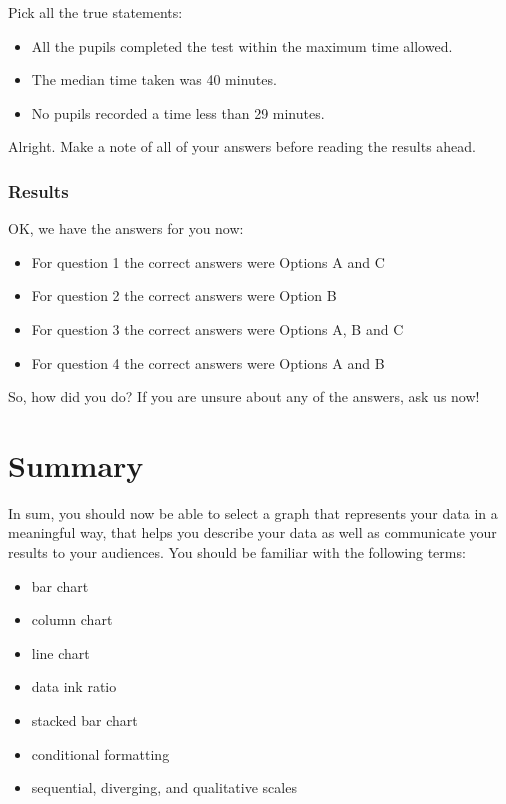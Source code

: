 \documentclass[
]{book}
\providecommand{\tightlist}{%
  \setlength{\itemsep}{0pt}\setlength{\parskip}{0pt}}
\begin{document}
Pick all the true statements:

\begin{itemize}
\tightlist
\item
  All the pupils completed the test within the maximum time allowed.
\item
  The median time taken was 40 minutes.
\item
  No pupils recorded a time less than 29 minutes.
\end{itemize}

Alright. Make a note of all of your answers before reading the results ahead.

\hypertarget{results}{%
\subsubsection*{Results}\label{results}}

OK, we have the answers for you now:

\begin{itemize}
\tightlist
\item
  For question 1 the correct answers were Options A and C
\item
  For question 2 the correct answers were Option B
\item
  For question 3 the correct answers were Options A, B and C
\item
  For question 4 the correct answers were Options A and B
\end{itemize}

So, how did you do? If you are unsure about any of the answers, ask us now!

\hypertarget{summary-5}{%
\section{Summary}\label{summary-5}}

In sum, you should now be able to select a graph that represents your data in a meaningful way, that helps you describe your data as well as communicate your results to your audiences. You should be familiar with the following terms:

\begin{itemize}
\tightlist
\item
  bar chart
\item
  column chart
\item
  line chart
\item
  data ink ratio
\item
  stacked bar chart
\item
  conditional formatting
\item
  sequential, diverging, and qualitative scales
\end{itemize}
\end{document}
